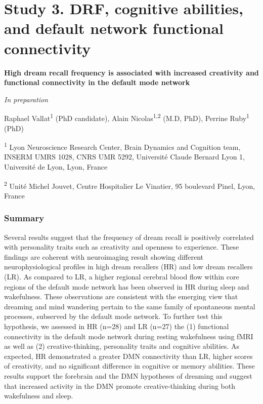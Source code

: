 \cleardoublepage

\chapter{Study 3. DRF, cognitive abilities, and default network functional connectivity}
\label{res:dmn-crea}

\cleardoublepage

\textbf{{\large High dream recall frequency is associated with increased creativity and functional connectivity in the default mode network}}

\hfill \emph{In preparation}

\bigskip

Raphael Vallat\textsuperscript{1} (PhD candidate), Alain Nicolas\textsuperscript{1,2} (M.D, PhD), Perrine Ruby\textsuperscript{1} (PhD)

\textsuperscript{1} Lyon Neuroscience Research Center, Brain Dynamics and Cognition team, INSERM UMRS 1028, CNRS UMR 5292, Université Claude Bernard Lyon 1, Université de Lyon, Lyon, France

\textsuperscript{2} Unité Michel Jouvet, Centre Hospitalier Le Vinatier, 95 boulevard Pinel, Lyon, France

\subsection*{Summary}
\label{res:dmn-crea:summary}
Several results suggest that the frequency of dream recall is positively correlated with personality traits such as creativity and openness to experience. These findings are coherent with neuroimaging result showing different neurophysiological profiles in high dream recallers (HR) and low dream recallers (LR).  As compared to LR, a higher regional cerebral blood flow within core regions of the default mode network has been observed in HR during sleep and wakefulness. These observations are consistent with the emerging view that dreaming and mind wandering pertain to the same family of spontaneous mental processes, subserved by the default mode network. To further test this hypothesis, we assessed in HR (n=28) and LR (n=27) the (1) functional connectivity in the default mode network during resting wakefulness using fMRI as well as (2) creative-thinking, personality traits and cognitive abilities. As expected, HR demonstrated a greater DMN connectivity than LR, higher scores of creativity, and no significant difference in cognitive or memory abilities. These results support the forebrain and the DMN hypotheses of dreaming and suggest that increased activity in the DMN promote creative-thinking during both wakefulness and sleep.

